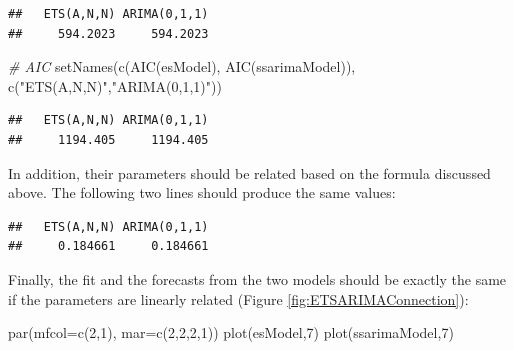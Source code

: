 \documentclass[
]{book}
\newenvironment{Shaded}{\begin{snugshade}}{\end{snugshade}}
\newcommand{\AttributeTok}[1]{\textcolor[rgb]{0.77,0.63,0.00}{#1}}
\newcommand{\CommentTok}[1]{\textcolor[rgb]{0.56,0.35,0.01}{\textit{#1}}}
\newcommand{\DecValTok}[1]{\textcolor[rgb]{0.00,0.00,0.81}{#1}}
\newcommand{\FunctionTok}[1]{\textcolor[rgb]{0.00,0.00,0.00}{#1}}
\newcommand{\NormalTok}[1]{#1}
\newcommand{\SpecialCharTok}[1]{\textcolor[rgb]{0.00,0.00,0.00}{#1}}
\newcommand{\StringTok}[1]{\textcolor[rgb]{0.31,0.60,0.02}{#1}}
\theoremstyle{definition}
\theoremstyle{definition}
\theoremstyle{definition}
\theoremstyle{definition}
\theoremstyle{remark}
\begin{document}
\begin{verbatim}
##   ETS(A,N,N) ARIMA(0,1,1) 
##     594.2023     594.2023
\end{verbatim}

\begin{Shaded}
\begin{Highlighting}[]
\CommentTok{\# AIC}
\FunctionTok{setNames}\NormalTok{(}\FunctionTok{c}\NormalTok{(}\FunctionTok{AIC}\NormalTok{(esModel), }\FunctionTok{AIC}\NormalTok{(ssarimaModel)),}
         \FunctionTok{c}\NormalTok{(}\StringTok{"ETS(A,N,N)"}\NormalTok{,}\StringTok{"ARIMA(0,1,1)"}\NormalTok{))}
\end{Highlighting}
\end{Shaded}

\begin{verbatim}
##   ETS(A,N,N) ARIMA(0,1,1) 
##     1194.405     1194.405
\end{verbatim}

In addition, their parameters should be related based on the formula discussed above. The following two lines should produce the same values:

\begin{Shaded}
\end{Shaded}

\begin{verbatim}
##   ETS(A,N,N) ARIMA(0,1,1) 
##     0.184661     0.184661
\end{verbatim}

Finally, the fit and the forecasts from the two models should be exactly the same if the parameters are linearly related (Figure \ref{fig:ETSARIMAConnection}):

\begin{Shaded}
\begin{Highlighting}[]
\FunctionTok{par}\NormalTok{(}\AttributeTok{mfcol=}\FunctionTok{c}\NormalTok{(}\DecValTok{2}\NormalTok{,}\DecValTok{1}\NormalTok{), }\AttributeTok{mar=}\FunctionTok{c}\NormalTok{(}\DecValTok{2}\NormalTok{,}\DecValTok{2}\NormalTok{,}\DecValTok{2}\NormalTok{,}\DecValTok{1}\NormalTok{))}
\FunctionTok{plot}\NormalTok{(esModel,}\DecValTok{7}\NormalTok{)}
\FunctionTok{plot}\NormalTok{(ssarimaModel,}\DecValTok{7}\NormalTok{)}
\end{Highlighting}
\end{Shaded}
\end{document}
